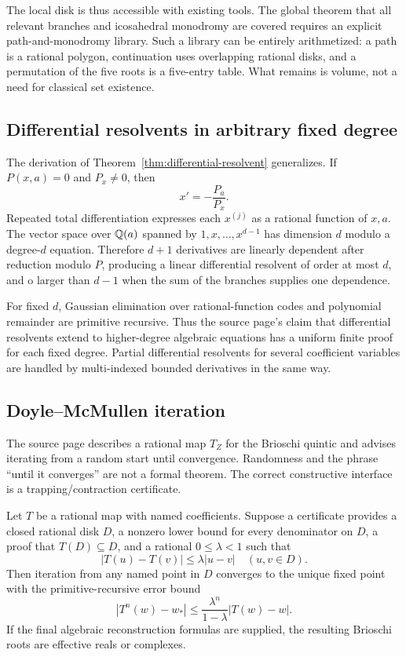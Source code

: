 The local disk is thus accessible with existing tools.  The global theorem that
all relevant branches and icosahedral monodromy are covered requires an
explicit path-and-monodromy library.  Such a library can be entirely
arithmetized: a path is a rational polygon, continuation uses overlapping
rational disks, and a permutation of the five roots is a five-entry table.
What remains is volume, not a need for classical set existence.

\subsection{Differential resolvents in arbitrary fixed degree}

The derivation of Theorem~\ref{thm:differential-resolvent} generalizes.  If
\(P(x,a)=0\) and \(P_x\ne0\), then
\[
 x'=-\frac{P_a}{P_x}.
\]
Repeated total differentiation expresses each \(x^{(j)}\) as a rational
function of \(x,a\).  The vector space over \(\mathbb Q(a)\) spanned by
\(1,x,\ldots,x^{d-1}\) has dimension \(d\) modulo a degree-\(d\) equation.
Therefore \(d+1\) derivatives are linearly dependent after reduction modulo
\(P\), producing a linear differential resolvent of order at most \(d\), and
o larger than \(d-1\) when the sum of the branches supplies one dependence.

For fixed \(d\), Gaussian elimination over rational-function codes and
polynomial remainder are primitive recursive.  Thus the source page's claim
that differential resolvents extend to higher-degree algebraic equations has a
uniform finite proof for each fixed degree.  Partial differential resolvents
for several coefficient variables are handled by multi-indexed bounded
derivatives in the same way.

\subsection{Doyle--McMullen iteration}

The source page describes a rational map \(T_Z\) for the Brioschi quintic and
advises iterating from a random start until convergence.  Randomness and the
phrase ``until it converges'' are not a formal theorem.  The correct
constructive interface is a trapping/contraction certificate.

\begin{theorem}\label{thm:certified-iteration}
Let \(T\) be a rational map with named coefficients.  Suppose a certificate
provides a closed rational disk \(D\), a nonzero lower bound for every
denominator on \(D\), a proof that \(T(D)\subseteq D\), and a rational
\(0\le\lambda<1\) such that
\[
 |T(u)-T(v)|\le\lambda|u-v|
 \quad(u,v\in D).
\]
Then iteration from any named point in \(D\) converges to the unique fixed point
with the primitive-recursive error bound
\[
 |T^n(w)-w_*|
 \le\frac{\lambda^n}{1-\lambda}|T(w)-w|.
\]
If the final algebraic reconstruction formulas are supplied, the resulting
Brioschi roots are effective \ipra{} reals or complexes.
\end{theorem}

